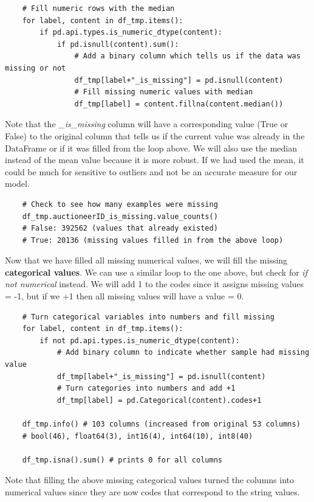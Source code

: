 \documentclass[11pt, a4paper]{article}
\begin{document}
\begin{spacing}{1.1}
\begin{lstlisting}
	# Fill numeric rows with the median
	for label, content in df_tmp.items():
		if pd.api.types.is_numeric_dtype(content):
			if pd.isnull(content).sum():
				# Add a binary column which tells us if the data was missing or not
				df_tmp[label+"_is_missing"] = pd.isnull(content)
				# Fill missing numeric values with median
				df_tmp[label] = content.fillna(content.median()) \end{lstlisting} \vspace*{1mm}
	Note that the \textit{\_is\_missing} column will have a corresponding value (True or False) to the original column that tells us if the current value was already in the DataFrame or if it was filled from the loop above. We will also use the median instead of the mean value because it is more robust. If we had used the mean, it could be much for sensitive to outliers and not be an accurate measure for our model. 
	\begin{lstlisting}
	# Check to see how many examples were missing
	df_tmp.auctioneerID_is_missing.value_counts()
	# False: 392562 (values that already existed)
	# True: 20136 (missing values filled in from the above loop) \end{lstlisting} \vspace*{1mm}
	Now that we have filled all missing numerical values, we will fill the missing \textbf{categorical values}. We can use a similar loop to the one above, but check for \textit{if not numerical} instead. We will add 1 to the codes since it assigns missing values = -1, but if we +1 then all missing values will have a value = 0. 
	\begin{lstlisting}
	# Turn categorical variables into numbers and fill missing
	for label, content in df_tmp.items():
		if not pd.api.types.is_numeric_dtype(content):
			# Add binary column to indicate whether sample had missing value
			df_tmp[label+"_is_missing"] = pd.isnull(content)
			# Turn categories into numbers and add +1
			df_tmp[label] = pd.Categorical(content).codes+1 
			
	df_tmp.info() # 103 columns (increased from original 53 columns)
	# bool(46), float64(3), int16(4), int64(10), int8(40)
	
	df_tmp.isna().sum() # prints 0 for all columns \end{lstlisting} \vspace*{1mm}
	Note that filling the above missing categorical values turned the columns into numerical values since they are now codes that correspond to the string values. \newpage


\end{spacing}
\end{document}
